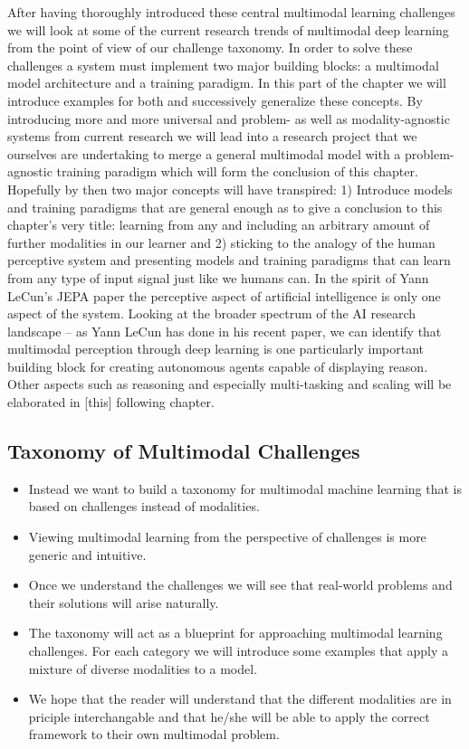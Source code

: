 \documentclass[
]{krantz}
\providecommand{\tightlist}{%
  \setlength{\itemsep}{0pt}\setlength{\parskip}{0pt}}
\begin{document}
After having thoroughly introduced these central multimodal learning challenges we will look at some of the current research trends of multimodal deep learning from the point of view of our challenge taxonomy. In order to solve these challenges a system must implement two major building blocks: a multimodal model architecture and a training paradigm. In this part of the chapter we will introduce examples for both and successively generalize these concepts. By introducing more and more universal and problem- as well as modality-agnostic systems from current research we will lead into a research project that we ourselves are undertaking to merge a general multimodal model with a problem-agnostic training paradigm which will form the conclusion of this chapter. Hopefully by then two major concepts will have transpired: 1) Introduce models and training paradigms that are general enough as to give a conclusion to this chapter's very title: learning from any and including an arbitrary amount of further modalities in our learner and 2) sticking to the analogy of the human perceptive system and presenting models and training paradigms that can learn from any type of input signal just like we humans can. In the spirit of Yann LeCun's JEPA paper the perceptive aspect of artificial intelligence is only one aspect of the system. Looking at the broader spectrum of the AI research landscape -- as Yann LeCun has done in his recent paper, we can identify that multimodal perception through deep learning is one particularly important building block for creating autonomous agents capable of displaying reason. Other aspects such as reasoning and especially multi-tasking and scaling will be elaborated in {[}this{]} following chapter.

\hypertarget{taxonomy-of-multimodal-challenges}{%
\subsection{Taxonomy of Multimodal Challenges}\label{taxonomy-of-multimodal-challenges}}

\begin{itemize}
\tightlist
\item
  Instead we want to build a taxonomy for multimodal machine learning that is based on challenges instead of modalities.
\item
  Viewing multimodal learning from the perspective of challenges is more generic and intuitive.
\item
  Once we understand the challenges we will see that real-world problems and their solutions will arise naturally.
\item
  The taxonomy will act as a blueprint for approaching multimodal learning challenges. For each category we will introduce some examples that apply a mixture of diverse modalities to a model.
\item
  We hope that the reader will understand that the different modalities are in priciple interchangable and that he/she will be able to apply the correct framework to their own multimodal problem.
\end{itemize}
\end{document}
